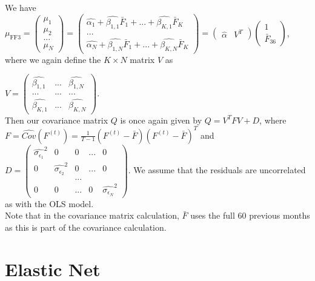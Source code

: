 \documentclass{article}
\begin{document}
We have $\mu_{\text{FF3}} = \begin{pmatrix} \mu_1\\
\mu_2\\
...\\
\mu_N \end{pmatrix} = \begin{pmatrix} \hat{\alpha_1} + \hat{\beta_{1,1}} \bar{F}_1 + ... + \hat{\beta_{K,1}} \bar{F}_K\\
...\\
\hat{\alpha_N} + \hat{\beta_{1,N}}\bar{F}_1 + ... + \hat{\beta_{K,N}}\bar{F}_K \end{pmatrix} =\begin{pmatrix} \hat{\alpha} & V^T \end{pmatrix} \begin{pmatrix} 1\\
\bar{F}_{36} \end{pmatrix}$, where we again define the $K \times N$ matrix $V$ as\\

\vspace{3mm}

$V = \begin{pmatrix} \hat{\beta_{1,1}} & ... & \hat{\beta_{1,N}}\\
... & ... & ...\\
\hat{\beta_{K,1}} & ... & \hat{\beta_{K,N}} \end{pmatrix}$.\\

Then our covariance matrix $Q$ is once again given by $Q = V^TFV + D$, where $F = \hat{Cov}(F^{(t)}) = \frac{1}{T-1}(F^{(t)} - \bar{F})(F^{(t)} - \bar{F})^{T}$ and $D = \begin{pmatrix} \hat{\sigma_{\epsilon_1}}^2 & 0 & 0 & ... & 0\\
0 & \hat{\sigma_{\epsilon_2}}^2 & 0 & ... & 0\\
 & & ... & &\\
0 & 0 & ... & 0 & \hat{\sigma_{\epsilon_N}}^2 \end{pmatrix}$. We assume that the residuals are uncorrelated as with the OLS model.\\

Note that in the covariance matrix calculation, $\bar{F}$ uses the full 60 previous months as this is part of the covariance calculation.\\


\break

\section{Elastic Net}
\end{document}
